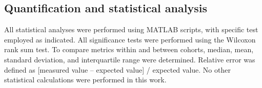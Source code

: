 \begin{refsection}
    
    
    \subsection{Quantification and statistical analysis}
    All statistical analyses were performed using MATLAB scripts, with specific test employed as indicated. All significance tests were performed using the Wilcoxon rank sum test. To compare metrics within and between cohorts, median, mean, standard deviation, and interquartile range were determined. Relative error was defined as [measured value – expected value] / expected value. No other statistical calculations were performed in this work.
    
    \par
    \printbibliography[heading=subbibliography, title={References}]
\end{refsection}    
